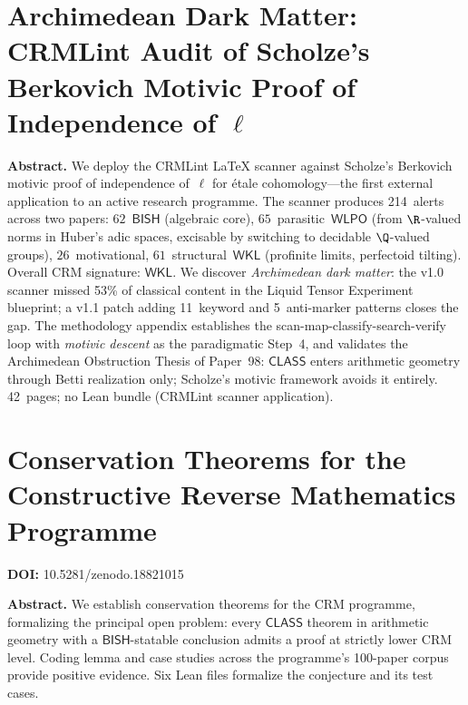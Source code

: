 \documentclass[11pt,a4paper]{article}
\begin{document}
\newpage

\section{Archimedean Dark Matter: CRMLint Audit of Scholze's Berkovich Motivic Proof of Independence of $\ell$}
\label{sec:p101}

\bigskip
\noindent\textbf{Abstract.}
We deploy the CRMLint LaTeX scanner against Scholze's Berkovich motivic proof of independence of~$\ell$ for \'etale cohomology---the first external application to an active research programme. The scanner produces 214~alerts across two papers: $62$~$\mathsf{BISH}$ (algebraic core), $65$~parasitic~$\mathsf{WLPO}$ (from $\R$-valued norms in Huber's adic spaces, excisable by switching to decidable $\Q$-valued groups), $26$~motivational, $61$~structural~$\mathsf{WKL}$ (profinite limits, perfectoid tilting). Overall CRM signature: $\mathsf{WKL}$. We discover \emph{Archimedean dark matter}: the v1.0 scanner missed 53\% of classical content in the Liquid Tensor Experiment blueprint; a v1.1 patch adding 11~keyword and 5~anti-marker patterns closes the gap. The methodology appendix establishes the scan-map-classify-search-verify loop with \emph{motivic descent} as the paradigmatic Step~4, and validates the Archimedean Obstruction Thesis of Paper~98: $\mathsf{CLASS}$ enters arithmetic geometry through Betti realization only; Scholze's motivic framework avoids it entirely. 42~pages; no Lean bundle (CRMLint scanner application).

\newpage

\section{Conservation Theorems for the Constructive Reverse Mathematics Programme}
\label{sec:p102}
\textbf{DOI:} 10.5281/zenodo.18821015

\bigskip
\noindent\textbf{Abstract.}
We establish conservation theorems for the CRM programme, formalizing the principal open problem: every $\mathsf{CLASS}$ theorem in arithmetic geometry with a $\mathsf{BISH}$-statable conclusion admits a proof at strictly lower CRM level. Coding lemma and case studies across the programme's 100-paper corpus provide positive evidence. Six Lean files formalize the conjecture and its test cases.
\end{document}

